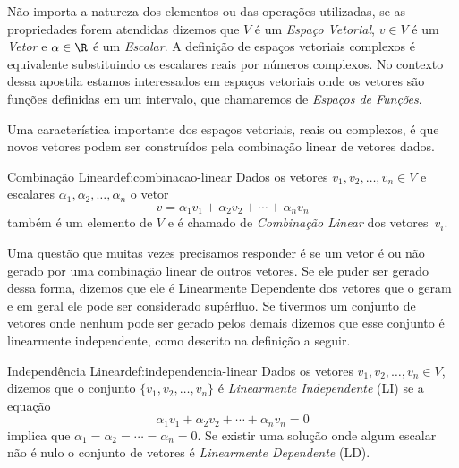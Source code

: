 Não importa a natureza dos elementos ou das operações utilizadas,
se as propriedades forem atendidas dizemos que $V$ é um \emph{Espaço Vetorial},
$v\in V$ é um \emph{Vetor} e $\alpha\in\R$ é um
\emph{Escalar}. A definição de espaços vetoriais complexos é
equivalente substituindo os escalares reais por números complexos. No contexto dessa
apostila estamos interessados em espaços vetoriais onde os vetores são funções
definidas em um intervalo, que chamaremos de
\emph{Espaços de Funções}.

Uma característica importante dos espaços vetoriais, reais ou complexos,
é que novos vetores podem ser construídos pela combinação linear de vetores dados.

\begin{definicao}{Combinação Linear}{def:combinacao-linear}
  Dados os vetores \(v_1, v_2, \dots, v_n \in V\) e escalares
  \( \alpha_1, \alpha_2, \dots, \alpha_n \) o vetor
  \[
    v = \alpha_1 v_1 + \alpha_2 v_2 + \cdots + \alpha_n v_n
  \]
  também é um elemento de $V$ e é chamado de
  \emph{Combinação Linear} dos vetores~$v_i$.
\end{definicao}

Uma questão que muitas vezes precisamos responder é se um vetor
é ou não gerado por uma combinação linear de outros vetores.
Se ele puder ser gerado dessa forma, dizemos que ele é
Linearmente Dependente dos vetores
que o geram e em geral ele pode ser considerado supérfluo. Se tivermos
um conjunto de vetores onde nenhum pode ser gerado pelos demais dizemos
que esse conjunto é linearmente independente, como descrito na definição a seguir.

\begin{definicao}{Independência Linear}{def:independencia-linear}
  Dados os vetores \(v_1, v_2, \dots, v_n \in V\), dizemos que o conjunto
  \(\{v_1, v_2, \dots, v_n\}\) é
  \emph{Linearmente Independente} (LI)
  se a equação
  \[
   \alpha_1 v_1 + \alpha_2 v_2 + \cdots + \alpha_n v_n = 0
  \]
  implica que \( \alpha_1 = \alpha_2 = \cdots = \alpha_n = 0 \).
  Se existir uma solução onde algum escalar não é nulo o conjunto de vetores
  é \emph{Linearmente Dependente} (LD).
\end{definicao}


